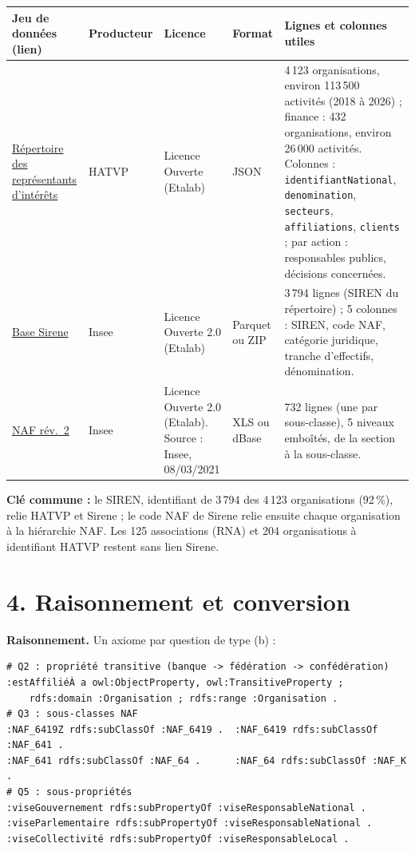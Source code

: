 \documentclass[11pt,a4paper]{article}
\begin{document}
\medskip
{\small
\begin{xltabular}{\linewidth}{@{}>{\raggedright\arraybackslash}p{2.7cm} l >{\raggedright\arraybackslash}p{2.9cm} >{\raggedright\arraybackslash}p{1.6cm} Y@{}}
  \toprule
  \textbf{Jeu de données (lien)} & \textbf{Producteur} & \textbf{Licence} & \textbf{Format} & \textbf{Lignes et colonnes utiles}\\
  \midrule
  \endhead
  \href{https://www.data.gouv.fr/api/1/datasets/r/46cd8d72-dd5e-4198-88b5-ab95702ba6dd}{Répertoire des représentants d'intérêts} & HATVP & Licence Ouverte (Etalab) & JSON & 4\,123 organisations, environ 113\,500 activités (2018 à 2026) ; finance : 432 organisations, environ 26\,000 activités. Colonnes : \texttt{identifiantNational}, \texttt{denomination}, \texttt{secteurs}, \texttt{affiliations}, \texttt{clients} ; par action : responsables publics, décisions concernées.\\
  \addlinespace
  \href{https://www.data.gouv.fr/datasets/base-sirene-des-entreprises-et-de-leurs-etablissements-siren-siret}{Base Sirene} & Insee & Licence Ouverte 2.0 (Etalab) & Parquet ou ZIP & 3\,794 lignes (SIREN du répertoire) ; 5 colonnes : SIREN, code NAF, catégorie juridique, tranche d'effectifs, dénomination.\\
  \addlinespace
  \href{https://www.insee.fr/fr/statistiques/fichier/2120875/naf2008_5_niveaux.xls}{NAF rév.\ 2} & Insee & Licence Ouverte 2.0 (Etalab). Source : Insee, 08/03/2021 & XLS ou dBase & 732 lignes (une par sous-classe), 5 niveaux emboîtés, de la section à la sous-classe.\\
  \bottomrule
\end{xltabular}}

\medskip
\textbf{Clé commune :} le SIREN, identifiant de 3\,794 des 4\,123 organisations (92\,\%), relie HATVP et Sirene ; le code NAF de Sirene relie ensuite chaque organisation à la hiérarchie NAF. Les 125 associations (RNA) et 204 organisations à identifiant HATVP restent sans lien Sirene.

\section*{4. Raisonnement et conversion}

\textbf{Raisonnement.} Un axiome par question de type (b) :

{\footnotesize
\begin{verbatim}
# Q2 : propriété transitive (banque -> fédération -> confédération)
:estAffiliéÀ a owl:ObjectProperty, owl:TransitiveProperty ;
    rdfs:domain :Organisation ; rdfs:range :Organisation .
# Q3 : sous-classes NAF
:NAF_6419Z rdfs:subClassOf :NAF_6419 .  :NAF_6419 rdfs:subClassOf :NAF_641 .
:NAF_641 rdfs:subClassOf :NAF_64 .      :NAF_64 rdfs:subClassOf :NAF_K .
# Q5 : sous-propriétés
:viseGouvernement rdfs:subPropertyOf :viseResponsableNational .
:viseParlementaire rdfs:subPropertyOf :viseResponsableNational .
:viseCollectivité rdfs:subPropertyOf :viseResponsableLocal .
\end{verbatim}}
\end{document}
